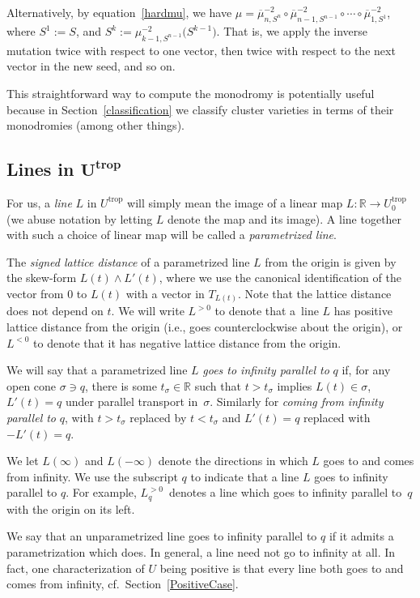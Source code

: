 \documentclass[11pt]{article}
\numberwithin{equation}{section}
\numberwithin{figure}{section}
\numberwithin{table}{section}
\DeclareMathOperator{\trop}{trop}
\let\?=\overline
\let\bb=\mathbb
\let\rar=\rightarrow
\theoremstyle{definition}
\begin{document}
Alternatively, by equation~\eqref{hardmu}, we have $\mu = \?{\mu}_{n,S^{n}}^{-2} \circ \?{\mu}_{n-1,S^{n-1}}^{-2} \circ \cdots \circ \?{\mu}_{1,S^{1}}^{-2}$, where $S^1:=S$, and $S^{k}:= \mu_{k-1,S^{n-1}}^{-2} \big(S^{k-1}\big)$. That is, we apply the inverse mutation twice with respect to one vector, then twice with respect to the next vector in the new seed, and so on.

This straightforward way to compute the monodromy is potentially useful because in Section~\ref{classification} we classify cluster varieties in terms of their monodromies (among other things).

\subsection[Lines in $U^{\trop}$]{Lines in $\boldsymbol{U^{\trop}}$} \label{lines}

For us, a {\it line} $L$ in $U^{\trop}$ will simply mean the image of a linear map $L\colon \bb{R}\rar U^{\trop}_0$ (we abuse notation by letting $L$ denote the map and its image). A line together with such a choice of linear map will be called a {\it parametrized line}.

The {\it signed lattice distance} of a parametrized line $L$ from the origin is given by the skew-form $L(t)\wedge L'(t)$, where we use the canonical identification of the vector from $0$ to $L(t)$ with a vector in $T_{L(t)}$. Note that the lattice distance does not depend on $t$. We will write $L^{>0}$ to denote that a~line $L$ has positive lattice distance from the origin (i.e., goes counterclockwise about the origin), or~$L^{<0}$ to denote that it has negative lattice distance from the origin.

We will say that a parametrized line $L$ {\it goes to infinity parallel to} $q$ if, for any open cone $\sigma \ni q$, there is some $t_\sigma\in \bb{R}$ such that $t>t_{\sigma}$ implies $L(t) \in \sigma$, $L'(t)=q$ under parallel transport in~$\sigma$. Similarly for {\it coming from infinity parallel to} $q$, with $t>t_{\sigma}$ replaced by $t<t_{\sigma}$ and $L'(t)=q$ replaced with $-L'(t)=q$.

We let $L(\infty)$ and $L(-\infty)$ denote the directions in which $L$ goes to and comes from infinity. We use the subscript $q$ to indicate that a line $L$ goes to infinity parallel to $q$. For example, $L_q^{>0}$~denotes a line which goes to infinity parallel to~$q$ with the origin on its left.

We say that an unparametrized line goes to infinity parallel to $q$ if it admits a parametrization which does. In general, a line need not go to infinity at all. In fact, one characterization of $U$ being positive is that every line both goes to and comes from infinity, cf.\ Section~\ref{PositiveCase}.
\end{document}

